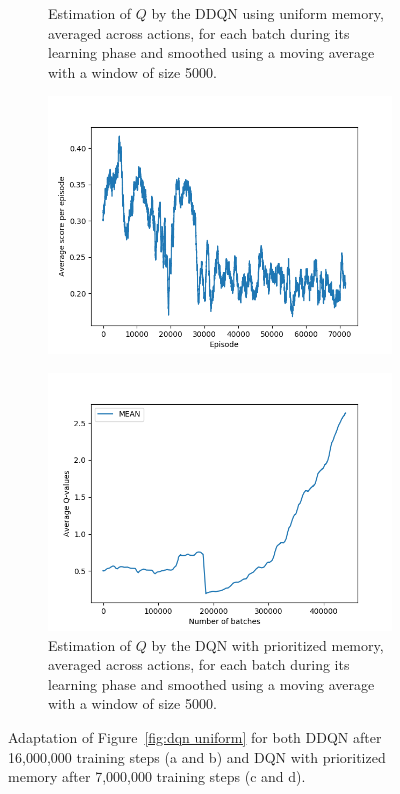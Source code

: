 \documentclass[letterpaper]{article}
\begin{document}
\begin{figure}[!t]
\begin{subfigure}{.47\textwidth}
		\caption{Estimation of $Q$ by the DDQN using uniform memory, averaged across actions, for each batch during its learning phase and smoothed using a moving average
		with a window of size 5000.}
	\end{subfigure}
	\begin{subfigure}{.47\textwidth}
		\includegraphics[width=\textwidth]{figures/dqn_prioritized_e_scores}
	\end{subfigure}
	\hfill
	\begin{subfigure}{.47\textwidth}
		\includegraphics[width=\textwidth]{figures/dqn_prioritized_q_values}
		\caption{Estimation of $Q$ by the DQN with prioritized memory, averaged across actions, for each batch during its learning phase and smoothed using a moving average
		with a window of size 5000.}
	\end{subfigure}
	\caption{Adaptation of Figure~\ref{fig:dqn uniform} for both DDQN after 16,000,000 training steps (a and b) and DQN with prioritized memory after 7,000,000
	training steps (c and d).\label{fig:DDQN + DQNP}}
\end{figure}
\end{document}

